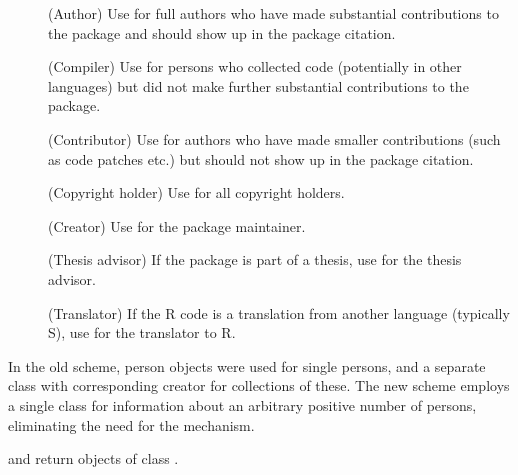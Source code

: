\begin{Details}
\begin{description}
\item[] (Author) Use for full authors who have made
substantial contributions to the package and should show up in the
package citation.
\item[] (Compiler) Use for persons who collected code
(potentially in other languages) but did not make further
substantial contributions to the package. 
\item[] (Contributor) Use for authors who have made
smaller contributions (such as code patches etc.) but should not
show up in the package citation.
\item[] (Copyright holder) Use for all copyright holders.
\item[] (Creator) Use for the package maintainer.
\item[] (Thesis advisor) If the package is part of a
thesis, use for the thesis advisor.
\item[] (Translator) If the R code is a translation from
another language (typically S), use for the translator to R.

\end{description}


In the old scheme, person objects were used for single persons, and a
separate  class with corresponding creator
 for collections of these.  The new scheme employs
a single class for information about an arbitrary positive number of
persons, eliminating the need for the  mechanism.
\end{Details}
%
\begin{Value}
 and  return objects of class
.
\end{Value}
%
\begin{SeeAlso}\relax
{}
\end{SeeAlso}
%
